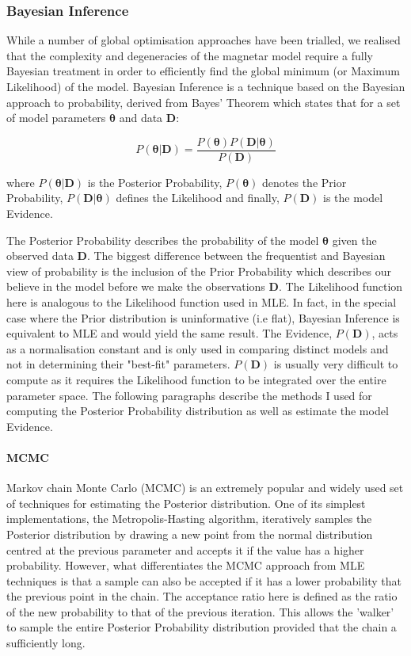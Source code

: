 \subsubsection{Bayesian Inference}
While a number of global optimisation approaches have been trialled, we realised that the complexity and degeneracies of the magnetar model require a fully Bayesian treatment in order to efficiently find the global minimum (or Maximum Likelihood) of the model. Bayesian Inference is a technique based on the Bayesian approach to probability, derived from Bayes' Theorem which states that for a set of model parameters $\mathbf{\theta}$ and data $\mathbf{D}$:

\begin{equation}
  P(\mathbf{\theta}|\mathbf{D}) = \frac{P(\mathbf{\theta}) P(\mathbf{D}|\mathbf{\theta})}{P(\mathbf{D})}
\end{equation}

\noindent where $P(\mathbf{\theta}|\mathbf{D})$ is the Posterior Probability, $P(\mathbf{\theta})$ denotes the Prior Probability, $P(\mathbf{D}|\mathbf{\theta})$ defines the Likelihood and finally, $P(\mathbf{D})$ is the model Evidence.

The Posterior Probability describes the probability of the model $\mathbf{\theta}$ given the observed data $\mathbf{D}$. The biggest difference between the frequentist and Bayesian view of probability is the inclusion of the Prior Probability which describes our believe in the model before we make the observations $\textbf{D}$. The Likelihood function here is analogous to the Likelihood function used in MLE. In fact, in the special case where the Prior distribution is uninformative (i.e flat), Bayesian Inference is equivalent to MLE and would yield the same result. The Evidence, $P(\mathbf{D})$, acts as a normalisation constant and is only used in comparing distinct models and not in determining their "best-fit" parameters. $P(\mathbf{D})$ is usually very difficult to compute as it requires the Likelihood function to be integrated over the entire parameter space. The following paragraphs describe the methods I used for computing the Posterior Probability distribution as well as estimate the model Evidence.

\paragraph{MCMC}
Markov chain Monte Carlo (MCMC) is an extremely popular and widely used set of techniques for estimating the Posterior distribution. One of its simplest implementations, the Metropolis-Hasting algorithm, iteratively samples the Posterior distribution by drawing a new point from the normal distribution centred at the previous parameter and accepts it if the value has a higher probability. However, what differentiates the MCMC approach from MLE techniques is that a sample can also be accepted if it has a lower probability that the previous point in the chain. The acceptance ratio here is defined as the ratio of the new probability to that of the previous iteration. This allows the 'walker' to sample the entire Posterior Probability distribution provided that the chain a sufficiently long.


